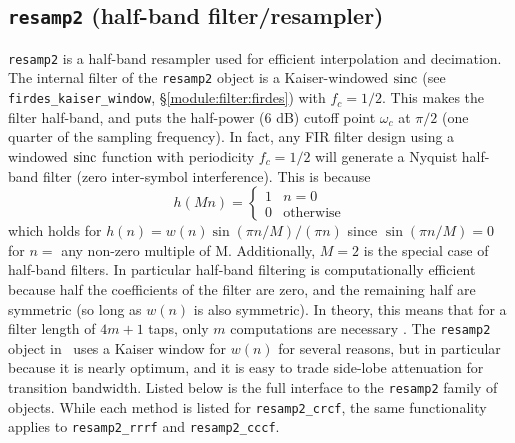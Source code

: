 \subsection{{\tt resamp2} (half-band filter/resampler)}
\label{module:filter:resamp2}
{\tt resamp2} is a half-band resampler used for efficient interpolation
and decimation.
The internal filter of the {\tt resamp2} object is a Kaiser-windowed $\textup{sinc}$
(see {\tt firdes\_kaiser\_window}, \S\ref{module:filter:firdes}) with
$f_c = 1/2$.
This makes the filter half-band, and puts the half-power (6 dB) cutoff point
$\omega_c$ at $\pi/2$ (one quarter of the sampling frequency).
In fact, any FIR filter design using a windowed $\textup{sinc}$ function with
periodicity $f_c=1/2$ will generate a Nyquist half-band filter (zero
inter-symbol interference).
This is because \cite[(4.6.3)]{Vaidyanathan:1993}
%
\begin{equation}
\label{eqn:filter:resamp:h}
    h(Mn) = 
        \begin{cases}
        1 & n=0 \\
        0 & \text{otherwise}
        \end{cases}
\end{equation}
%
which holds for $h(n) = w(n) \sin(\pi n/M) / (\pi n)$ since
$\sin(\pi n/M) = 0$ for $n=$ any non-zero multiple of M.
Additionally, $M=2$ is the special case of half-band filters.
In particular half-band filtering is computationally efficient because half
the coefficients of the filter are zero, and the remaining half are symmetric
(so long as $w(n)$ is also symmetric).
In theory, this means that for a filter length of $4m+1$ taps, only $m$
computations are necessary \cite{harris:2004}.
The {\tt resamp2} object in \liquid\ uses a Kaiser window for $w(n)$ for
several reasons, but in particular because it is nearly optimum, and it is
easy to trade side-lobe attenuation for transition bandwidth.
%
Listed below is the full interface to the {\tt resamp2} family of
objects.
While each method is listed for {\tt resamp2\_crcf}, the same
functionality applies to {\tt resamp2\_rrrf} and {\tt resamp2\_cccf}.
%
